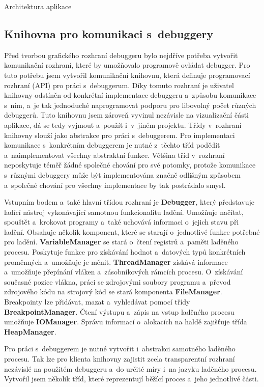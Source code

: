 \documentclass[czech,bachelor,male,python,dept460,hidelinks]{diploma}						%
\newcommand{\parspace}[1][]{
	\ifthenelse{\isempty{#1}}{\vspace{0mm}}{\vspace{#1}}
	\par
}
\begin{document}
\begin{section}{Architektura aplikace}
\section{Knihovna pro komunikaci s~debuggery}
	\label{sec:DebuggerApi}
		Před tvorbou grafického rozhraní debuggeru bylo nejdříve potřeba vytvořit komunikační rozhraní, které by umožňovalo programově ovládat debugger.
		Pro tuto potřebu jsem vytvořil komunikační knihovnu, která definuje programovací rozhraní (API) pro práci s~debuggerum. Díky tomuto rozhraní
		je uživatel knihovny odstíněn od konkrétní implementace debuggeru a~způsobu komunikace s~ním, a~je tak jednoduché naprogramovat podporu pro libovolný
		počet různých debuggerů. Tuto knihovnu jsem zároveň vyvinul nezávisle na vizualizační části aplikace, dá se tedy vyjmout a~použít i~v~jiném projektu.
		Třídy v~rozhraní knihovny slouží jako abstrakce pro práci s~debuggerem. Pro implementaci komunikace s~konkrétním debuggerem je nutné z~těchto tříd podědit
		a~naimplementovat všechny abstraktní funkce. Většina tříd v~rozhraní neposkytuje téměř žádné společné chování pro své potomky, protože komunikace
		s~různými debuggery může být implementována značně odlišným způsobem a~společné chování pro všechny implementace by tak postrádalo smysl.
		
		\parspace Vstupním bodem a~také hlavní třídou rozhraní je \textbf{Debugger}, který představuje ladící nástroj vykonávající samotnou funkcionalitu ladění.
		Umožňuje načítat, spouštět a~krokovat programy a~také uchovává informaci o~jejich stavu při ladění. Obsahuje několik komponent, které se starají o~jednotlivé
		funkce potřebné pro ladění. \textbf{VariableManager} se stará o~čtení registrů a~paměti laděného procesu. Poskytuje funkce pro získávání hodnot
a~datových typů konkrétních proměnných a~umožňuje je měnit. \textbf{ThreadManager} získává informace a~umožňuje přepínání vláken a~zásobníkových rámcích procesu.
		O~získávání současné pozice vlákna, práci se zdrojovými soubory programu a~převod zdrojového kódu na strojový kód se stará komponenta \textbf{FileManager}.
		Breakpointy lze přidávat, mazat a~vyhledávat pomocí třídy \textbf{BreakpointManager}. Čtení výstupu a~zápis na vstup laděného procesu umožňuje
		\textbf{IOManager}. Správu informací o~alokacích na haldě zajišťuje třída \textbf{HeapManager}.
		
		\parspace Pro práci s~debuggerem je nutné vytvořit i~abstrakci samotného laděného procesu. Tak lze pro klienta knihovny zajistit zcela transparentní
		rozhraní nezávislé na použitém debuggeru a~do určité míry i~na jazyku laděného procesu. Vytvořil jsem několik tříd, které reprezentují běžící proces
a~jeho jednotlivé části.
		

\end{section}
\end{document}
